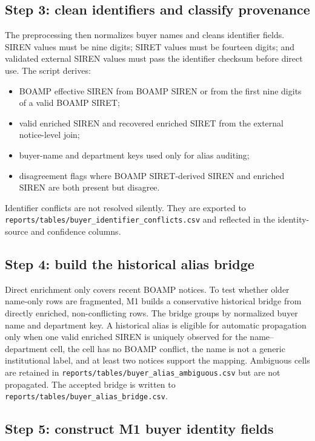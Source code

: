 \documentclass[11pt]{article}
\begin{document}
\subsection{Step 3: clean identifiers and classify provenance}

The preprocessing then normalizes buyer names and cleans identifier fields.
SIREN values must be nine digits; SIRET values must be fourteen digits; and
validated external SIREN values must pass the identifier checksum before
direct use. The script derives:

\begin{itemize}
  \item BOAMP effective SIREN from BOAMP SIREN or from the first nine digits
        of a valid BOAMP SIRET;
  \item valid enriched SIREN and recovered enriched SIRET from the external
        notice-level join;
  \item buyer-name and department keys used only for alias auditing;
  \item disagreement flags where BOAMP SIRET-derived SIREN and enriched
        SIREN are both present but disagree.
\end{itemize}

Identifier conflicts are not resolved silently. They are exported to
\texttt{reports/tables/buyer\_identifier\_conflicts.csv} and reflected in
the identity-source and confidence columns.

\subsection{Step 4: build the historical alias bridge}

Direct enrichment only covers recent BOAMP notices. To test whether older
name-only rows are fragmented, M1 builds a conservative historical bridge
from directly enriched, non-conflicting rows. The bridge groups by normalized
buyer name and department key. A historical alias is eligible for automatic
propagation only when one valid enriched SIREN is uniquely observed for the
name--department cell, the cell has no BOAMP conflict, the name is not a
generic institutional label, and at least two notices support the mapping.
Ambiguous cells are retained in
\texttt{reports/tables/buyer\_alias\_ambiguous.csv} but are not propagated.
The accepted bridge is written to
\texttt{reports/tables/buyer\_alias\_bridge.csv}.

\subsection{Step 5: construct M1 buyer identity fields}
\end{document}

